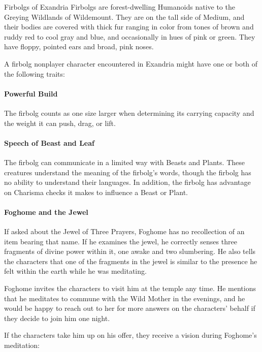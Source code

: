 \documentclass[10pt,a4paper,twoside,bg=print,twocolumn,openany,nodeprecatedcode]{dndbook}
\begin{document}
  
\begin{DndSidebar}{Firbolgs of Exandria}
Firbolgs are forest-dwelling Humanoids native to the Greying Wildlands of Wildemount. They are on the tall side of Medium, and their bodies are covered with thick fur ranging in color from tones of brown and ruddy red to cool gray and blue, and occasionally in hues of pink or green. They have floppy, pointed ears and broad, pink noses.

A firbolg nonplayer character encountered in Exandria might have one or both of the following traits:

\paragraph{Powerful Build}
The firbolg counts as one size larger when determining its carrying capacity and the weight it can push, drag, or lift.

\paragraph{Speech of Beast and Leaf}
The firbolg can communicate in a limited way with Beasts and Plants. These creatures understand the meaning of the firbolg's words, though the firbolg has no ability to understand their languages. In addition, the firbolg has advantage on Charisma checks it makes to influence a Beast or Plant.
\end{DndSidebar}

\paragraph{Foghome and the Jewel}
If asked about the Jewel of Three Prayers, Foghome has no recollection of an item bearing that name. If he examines the jewel, he correctly senses three fragments of divine power within it, one awake and two slumbering. He also tells the characters that one of the fragments in the jewel is similar to the presence he felt within the earth while he was meditating.

Foghome invites the characters to visit him at the temple any time. He mentions that he meditates to commune with the Wild Mother in the evenings, and he would be happy to reach out to her for more answers on the characters' behalf if they decide to join him one night.

If the characters take him up on his offer, they receive a vision during Foghome's meditation:
\end{document}
